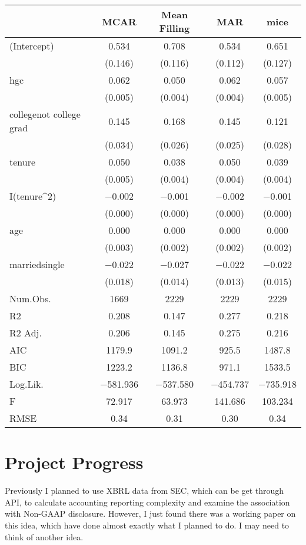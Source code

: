 \documentclass{article}
\begin{document}
\begin{table}[h!]
\centering
\begin{tabular}[t]{lcccc}
\toprule
  & MCAR & Mean Filling & MAR & mice\\
\midrule
(Intercept) & \num{0.534} & \num{0.708} & \num{0.534} & \num{0.651}\\
 & (\num{0.146}) & (\num{0.116}) & (\num{0.112}) & (\num{0.127})\\
hgc & \num{0.062} & \num{0.050} & \num{0.062} & \num{0.057}\\
 & (\num{0.005}) & (\num{0.004}) & (\num{0.004}) & (\num{0.005})\\
collegenot college grad & \num{0.145} & \num{0.168} & \num{0.145} & \num{0.121}\\
 & (\num{0.034}) & (\num{0.026}) & (\num{0.025}) & (\num{0.028})\\
tenure & \num{0.050} & \num{0.038} & \num{0.050} & \num{0.039}\\
 & (\num{0.005}) & (\num{0.004}) & (\num{0.004}) & (\num{0.004})\\
I(tenure\textasciicircum2) & \num{-0.002} & \num{-0.001} & \num{-0.002} & \num{-0.001}\\
 & (\num{0.000}) & (\num{0.000}) & (\num{0.000}) & (\num{0.000})\\
age & \num{0.000} & \num{0.000} & \num{0.000} & \num{0.000}\\
 & (\num{0.003}) & (\num{0.002}) & (\num{0.002}) & (\num{0.002})\\
marriedsingle & \num{-0.022} & \num{-0.027} & \num{-0.022} & \num{-0.022}\\
 & (\num{0.018}) & (\num{0.014}) & (\num{0.013}) & (\num{0.015})\\
\midrule
Num.Obs. & \num{1669} & \num{2229} & \num{2229} & \num{2229}\\
R2 & \num{0.208} & \num{0.147} & \num{0.277} & \num{0.218}\\
R2 Adj. & \num{0.206} & \num{0.145} & \num{0.275} & \num{0.216}\\
AIC & \num{1179.9} & \num{1091.2} & \num{925.5} & \num{1487.8}\\
BIC & \num{1223.2} & \num{1136.8} & \num{971.1} & \num{1533.5}\\
Log.Lik. & \num{-581.936} & \num{-537.580} & \num{-454.737} & \num{-735.918}\\
F & \num{72.917} & \num{63.973} & \num{141.686} & \num{103.234}\\
RMSE & \num{0.34} & \num{0.31} & \num{0.30} & \num{0.34}\\
\bottomrule
\end{tabular}
\end{table}

\section{Project Progress}

Previously I planned to use XBRL data from SEC, which can be get through API, to calculate accounting reporting complexity and examine the association with Non-GAAP disclosure. However, I just found there was a working paper on this idea, which have done almost exactly what I planned to do. I may need to think of another idea.
\end{document}
